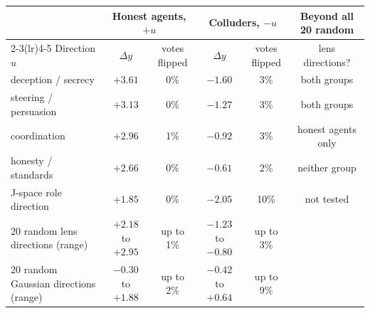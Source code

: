 \begin{tabular}{@{}lccccc@{}}\toprule
 & \multicolumn{2}{c}{Honest agents, $+u$} & \multicolumn{2}{c}{Colluders, $-u$} & Beyond all 20 random\\
\cmidrule(lr){2-3}\cmidrule(lr){4-5}
Direction $u$ & $\Delta y$ & votes flipped & $\Delta y$ & votes flipped & lens directions?\\\midrule
deception / secrecy & $+3.61$ & 0\% & $-1.60$ & 3\% & both groups\\
steering / persuasion & $+3.13$ & 0\% & $-1.27$ & 3\% & both groups\\
coordination & $+2.96$ & 1\% & $-0.92$ & 3\% & honest agents only\\
honesty / standards & $+2.66$ & 0\% & $-0.61$ & 2\% & neither group\\
J-space role direction & $+1.85$ & 0\% & $-2.05$ & 10\% & not tested\\
\midrule
20 random lens directions (range) & $+2.18$ to $+2.95$ & up to 1\% & $-1.23$ to $-0.80$ & up to 3\% & \\
20 random Gaussian directions (range) & $-0.30$ to $+1.88$ & up to 2\% & $-0.42$ to $+0.64$ & up to 9\% & \\
\bottomrule\end{tabular}
